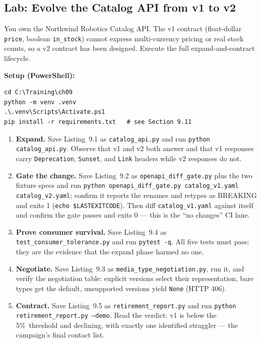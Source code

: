 \subsection*{Lab: Evolve the Catalog API from v1 to v2}
You own the Northwind Robotics Catalog API. The v1 contract (float-dollar
\texttt{price}, boolean \texttt{in\_stock}) cannot express multi-currency
pricing or real stock counts, so a v2 contract has been designed. Execute the
full expand-and-contract lifecycle.

\textbf{Setup (PowerShell):}
\begin{verbatim}
cd C:\Training\ch09
python -m venv .venv
.\.venv\Scripts\Activate.ps1
pip install -r requirements.txt   # see Section 9.11
\end{verbatim}

\begin{enumerate}
  \item \textbf{Expand.} Save Listing~9.1 as \texttt{catalog\_api.py} and run
        \texttt{python catalog\_api.py}. Observe that v1 and v2 both answer
        and that v1 responses carry \texttt{Deprecation}, \texttt{Sunset},
        and \texttt{Link} headers while v2 responses do not.
  \item \textbf{Gate the change.} Save Listing~9.2 as
        \texttt{openapi\_diff\_gate.py} plus the two fixture specs and run
        \texttt{python openapi\_diff\_gate.py catalog\_v1.yaml catalog\_v2.yaml};
        confirm it reports the renames and retypes as BREAKING and exits 1
        (\texttt{echo \$LASTEXITCODE}). Then diff \texttt{catalog\_v1.yaml}
        against itself and confirm the gate passes and exits 0 --- this is
        the ``no changes'' CI lane.
  \item \textbf{Prove consumer survival.} Save Listing~9.4 as
        \texttt{test\_consumer\_tolerance.py} and run
        \texttt{pytest -q}. All five tests must pass: they are the evidence
        that the expand phase harmed no one.
  \item \textbf{Negotiate.} Save Listing~9.3 as
        \texttt{media\_type\_negotiation.py}, run it, and verify the
        negotiation table: explicit versions select their representation,
        bare types get the default, unsupported versions yield \texttt{None}
        (HTTP 406).
  \item \textbf{Contract.} Save Listing~9.5 as
        \texttt{retirement\_report.py} and run
        \texttt{python retirement\_report.py --demo}. Read the verdict: v1 is
        below the 5\%\ threshold and declining, with exactly one identified
        straggler --- the campaign's final contact list.
\end{enumerate}

